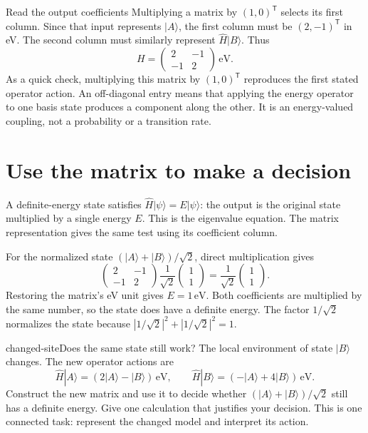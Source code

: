 \documentclass[11pt,a4paper]{article}
\begin{document}
\begin{profworked}{Read the output coefficients}
Multiplying a matrix by $(1,0)^{\mathsf T}$ selects its first column. Since
that input represents $|A\rangle$, the first column must be $(2,-1)^{\mathsf T}$
in eV. The second column must similarly represent $\hat H|B\rangle$.
Thus
\[
 H=\begin{pmatrix}2&-1\\-1&2\end{pmatrix}\,\mathrm{eV}.
\]
As a quick check, multiplying this matrix by $(1,0)^{\mathsf T}$ reproduces
the first stated operator action. An off-diagonal entry means that applying
the energy operator to one basis state produces a component along the other.
It is an energy-valued coupling, not a probability or a transition rate.
\end{profworked}

\section{Use the matrix to make a decision}

A definite-energy state satisfies $\hat H|\psi\rangle=E|\psi\rangle$:
the output is the original state multiplied by a single energy $E$.
This is the eigenvalue equation. The matrix representation gives the same
test using its coefficient column.

For the normalized state $(|A\rangle+|B\rangle)/\sqrt{2}$, direct multiplication
gives
\[
 \begin{pmatrix}2&-1\\-1&2\end{pmatrix}
 \frac{1}{\sqrt{2}}\begin{pmatrix}1\\1\end{pmatrix}
 =\frac{1}{\sqrt{2}}\begin{pmatrix}1\\1\end{pmatrix}.
\]
Restoring the matrix's eV unit gives $E=1\,\mathrm{eV}$. Both coefficients
are multiplied by the same number, so the state does have a definite energy.
The factor $1/\sqrt{2}$ normalizes the state because
$|1/\sqrt{2}|^2+|1/\sqrt{2}|^2=1$.

\begin{profattempt}{changed-site}{Does the same state still work?}
The local environment of state $|B\rangle$ changes. The new operator actions are
\[
 \hat H|A\rangle=(2|A\rangle-|B\rangle)\,\mathrm{eV},\qquad
 \hat H|B\rangle=(-|A\rangle+4|B\rangle)\,\mathrm{eV}.
\]
Construct the new matrix and use it to decide whether
$(|A\rangle+|B\rangle)/\sqrt{2}$ still has a definite energy.
Give one calculation that justifies your decision. This is one connected
task: represent the changed model and interpret its action.
\end{profattempt}
\end{document}

